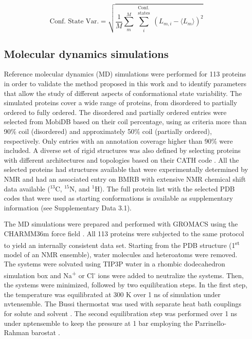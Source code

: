 \begin{equation}
\label{eq_conf_state_var}
\text{Conf. State Var.} = \sqrt{
  \frac{1}{M}
  \sum\limits^{M}_m
  \sum\limits^{\substack{\text{Conf.} \\ \text{states}}}_i
  (L_{m,i} - \langle L_{m} \rangle)^{2}
}
\end{equation}


\subsection{Molecular dynamics simulations} \label{MD_data_origin}

Reference molecular dynamics (MD) simulations were performed for 113 proteins in order to validate the method proposed in this work and to identify parameters that allow the study of different aspects of conformational state variability. The simulated proteins cover a wide range of proteins, from disordered to partially ordered to fully ordered. The disordered and partially ordered entries were selected from MobiDB \cite{piovesan_mobidb_2020} based on their coil percentage, using as criteria more than 90\% coil (disordered) and approximately 50\% coil (partially ordered), respectively. Only entries with an annotation coverage higher than 90\% were included. A diverse set of rigid structures was also defined by selecting proteins with different architectures and topologies based on their CATH code \cite{sillitoe_cath_2021}. All the selected proteins had structures available that were experimentally determined by NMR and had an associated entry on BMRB with extensive NMR chemical shift data  available ($^{13}$C,  $^{15}$N, and $^1$H). The full protein list with the selected PDB codes that were used as starting conformations is available as supplementary information (see Supplementary Data 3.1).

The MD simulations were prepared and performed with GROMACS \cite{van_der_spoel_gromacs_2005} using the CHARMM36m force field \cite{huang_charmm36m_2017}. All 113 proteins were subjected to the same protocol to yield an internally consistent data set. Starting from the PDB structure (1\textsuperscript{st} model of an NMR ensemble), water molecules and heteroatoms were removed. The systems were solvated using TIP3P water \cite{10.1063/1.445869} in a rhombic dodecahedron simulation box and Na\textsuperscript{+} or Cl\textsuperscript{-} ions were added to neutralize the systems. Then, the systems were minimized, followed by two equilibration steps. In the first step, the temperature was equilibrated at 300 K over 1 ns of simulation under \gls{nvtensemble}. The Bussi thermostat was used with separate heat bath couplings for solute and solvent \cite{bussi_canonical_2007}. The second equilibration step was performed over 1 ns under \gls{nptensemble} to keep the pressure at 1 bar employing the Parrinello-Rahman barostat \cite{parrinello_polymorphic_1981}. 

